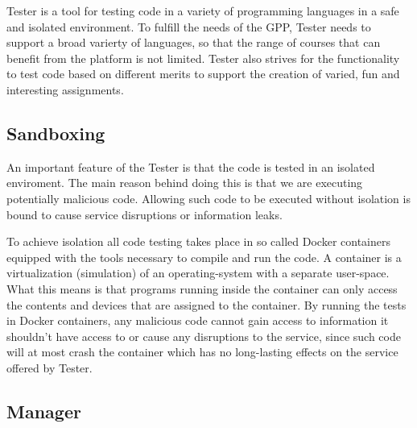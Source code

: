 Tester is a tool for testing code in a variety of programming languages in a safe and isolated environment. To fulfill the needs of the GPP, Tester needs to support a  broad varierty of languages, so that the range of courses that can benefit from the platform is not limited. Tester also strives for the functionality to test code based on different merits to support the creation of varied, fun and interesting assignments.

\subsection{Sandboxing}
An important feature of the Tester is that the code is tested in an isolated enviroment. The main reason behind doing this is that we are executing potentially malicious code. Allowing such code to be executed without isolation is bound to cause service disruptions or information leaks.

To achieve isolation all code testing takes place in so called Docker containers equipped with the tools necessary to compile and run the code. A container is a virtualization (simulation) of an operating-system with a separate user-space. What this means is that programs running inside the container can only access the contents and devices that are assigned to the container. By running the tests in Docker containers, any malicious code cannot gain access to information it shouldn't have access to or cause any disruptions to the service, since such code will at most crash the container which has no long-lasting effects on the service offered by Tester.
\subsection{Manager}



